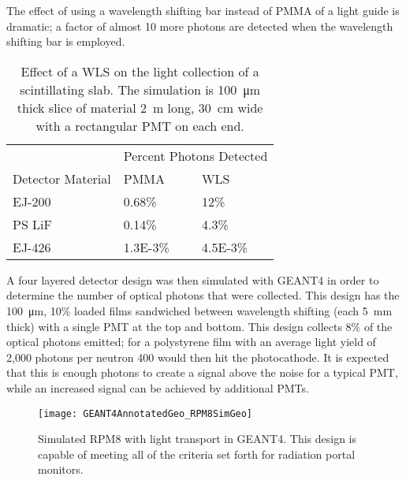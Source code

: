 The effect of using a wavelength shifting bar instead of PMMA of a light guide is dramatic; a factor of almost 10 more photons are detected when the wavelength shifting bar is employed.
  \begin{table}
  \caption[Light Collection Increase with a WLS Bar]{Effect of a WLS on the light collection of a scintillating slab. The simulation is \SI{100}{\um} thick slice of material \SI{2}{\m} long, \SI{30}{\cm} wide with a rectangular PMT on each end.}
  \label{tab:WLSStudy}
  \begin{tabular}{p{4cm} m{3cm} m{3cm}}
  \toprule
  & \multicolumn{2}{c}{Percent Photons Detected} \\
  Detector Material & PMMA &  WLS \\
  \midrule
 EJ-200 & 0.68\%  & 12\% \\
 PS LiF & 0.14\% & 4.3\% \\
 EJ-426 & \num{1.3E-3}\% & \num{4.5E-3}\% \\
 \bottomrule
  \end{tabular}
\end{table}

A four layered detector design was then simulated with GEANT4 in order to determine the number of optical photons that were collected.
This design has the \SI{100}{\um}, 10\% loaded  films sandwiched between wavelength shifting (each \SI{5}{\mm} thick) with a single PMT at the top and bottom.
This design collects 8\% of the optical photons emitted; for a polystyrene film with an average light yield of 2,000 photons per neutron 400 would then hit the photocathode.
It is expected that this is enough photons to create a signal above the noise for a typical PMT, while an increased signal can be achieved by additional PMTs.
\begin{figure}
  \centering
	\texttt{[image: GEANT4AnnotatedGeo\_RPM8SimGeo]}
	  \caption[GEANT4 Simulated RPM8 Detector Design]{Simulated RPM8 with light transport in GEANT4. This design is capable of meeting all of the criteria set forth for radiation portal monitors.}
  \label{fig:G4RPM8Geo}
\end{figure}

